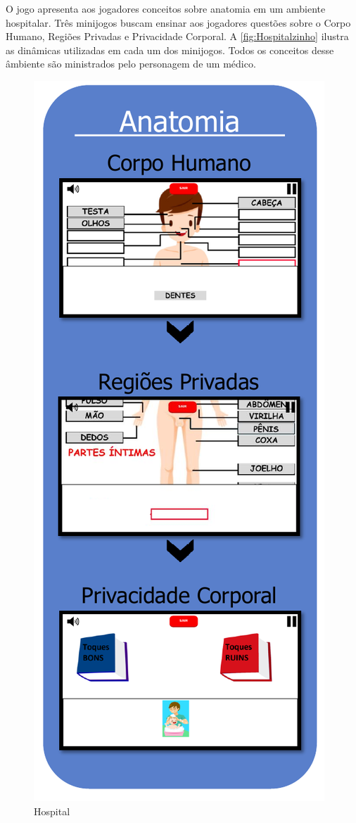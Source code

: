 \newpage

O jogo apresenta aos jogadores conceitos sobre anatomia em um ambiente hospitalar. Três minijogos buscam ensinar aos jogadores questões sobre o Corpo Humano, Regiões Privadas e Privacidade Corporal. A \autoref{fig:Hospitalzinho} ilustra as dinâmicas utilizadas em cada um dos minijogos. Todos os conceitos desse âmbiente são ministrados pelo personagem de um médico. 


\begin{figure}%
  \vspace{-20pt}
  \caption{\label{fig:Hospitalzinho}Hospital}
  \includegraphics[width=\linewidth]{./Figuras/Hospital.pdf}

\end{figure}
